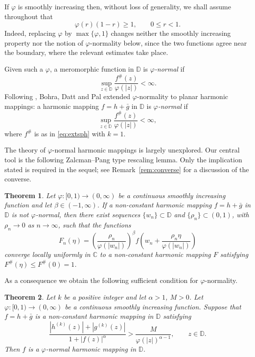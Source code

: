 \documentclass[10pt,a4paper]{amsart}
\newtheorem{theorem}{Theorem}[section]
\newcommand{\D}{\mathbb{D}}
\newcommand{\C}{\mathbb{C}}
\begin{document}
If $\varphi$ is smoothly increasing then, without loss of generality, we shall assume
throughout that
\begin{equation}\label{eq:phinorm}
 \varphi(r)(1-r)\ge 1,\qquad 0\le r<1.
\end{equation}
Indeed, replacing $\varphi$ by $\max\{\varphi,1\}$ changes neither the smoothly increasing
property nor the notion of $\varphi$-normality below, since the two functions agree near
the boundary, where the relevant estimates take place.

Given such a $\varphi$, a meromorphic function in $\D$ is \emph{$\varphi$-normal} if
\[
\sup_{z\in\D}\frac{f^{\#}(z)}{\varphi(|z|)}<\infty.
\]
Following \cite{AR}, Bohra, Datt and Pal \cite{BDP} extended $\varphi$-normality to planar
harmonic mappings: a harmonic mapping $f=h+\bar g$ in $\D$ is \emph{$\varphi$-normal} if
\[
\sup_{z\in\D}\frac{f^{\#}(z)}{\varphi(|z|)}<\infty,
\]
where $f^{\#}$ is as in \eqref{eq:extsph} with $k=1$.

The theory of $\varphi$-normal harmonic mappings is largely unexplored. Our central tool is
the following Zalcman--Pang type rescaling lemma. Only the implication stated is required in
the sequel; see Remark~\ref{rem:converse} for a discussion of the converse.


\begin{theorem}\label{thm:rescale}
Let $\varphi\colon[0,1)\to(0,\infty)$ be a continuous smoothly increasing function and let
$\beta\in(-1,\infty)$. If a non-constant harmonic mapping $f=h+\bar g$ in $\D$ is
\emph{not} $\varphi$-normal, then there exist sequences $\{w_{n}\}\subset\D$ and
$\{\rho_{n}\}\subset(0,1)$, with $\rho_{n}\to0$ as $n\to\infty$, such that the functions
\[
F_{n}(\eta)=\left(\frac{\rho_{n}}{\varphi(|w_{n}|)}\right)^{\beta}
f\!\left(w_{n}+\frac{\rho_{n}\eta}{\varphi(|w_{n}|)}\right)
\]
converge locally uniformly in $\C$ to a non-constant harmonic mapping $F$ satisfying
$F^{\#}(\eta)\le F^{\#}(0)=1$.
\end{theorem}


As a consequence we obtain the following sufficient condition for $\varphi$-normality.

\begin{theorem}\label{thm:phisuff}
Let $k$ be a positive integer and let $\alpha>1$, $M>0$. Let
$\varphi\colon[0,1)\to(0,\infty)$ be a continuous smoothly increasing function. Suppose that
$f=h+\bar g$ is a non-constant harmonic mapping in $\D$ satisfying
\begin{equation}\label{eq:phisuff}
\frac{|h^{(k)}(z)|+|g^{(k)}(z)|}{1+|f(z)|^{\alpha}}>\frac{M}{\varphi(|z|)^{\alpha-1}},
\qquad z\in\D.
\end{equation}
Then $f$ is a $\varphi$-normal harmonic mapping in $\D$.
\end{theorem}
\end{document}
